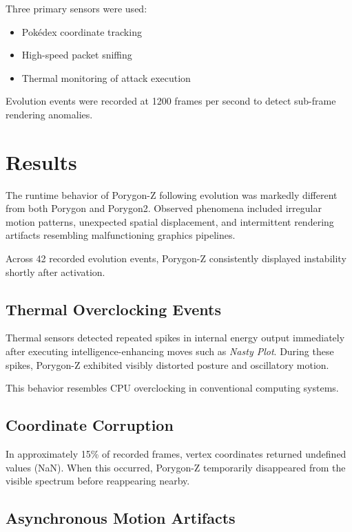 \documentclass[conference]{IEEEtran}
\begin{document}
Three primary sensors were used:

\begin{itemize}
\item Pokédex coordinate tracking
\item High-speed packet sniffing
\item Thermal monitoring of attack execution
\end{itemize}

Evolution events were recorded at 1200 frames per second to detect sub-frame rendering anomalies.

\section{Results}

The runtime behavior of Porygon-Z following evolution was markedly different from both Porygon and Porygon2. Observed phenomena included irregular motion patterns, unexpected spatial displacement, and intermittent rendering artifacts resembling malfunctioning graphics pipelines.

Across 42 recorded evolution events, Porygon-Z consistently displayed instability shortly after activation.

\subsection{Thermal Overclocking Events}

Thermal sensors detected repeated spikes in internal energy output immediately after executing intelligence-enhancing moves such as \textit{Nasty Plot}. During these spikes, Porygon-Z exhibited visibly distorted posture and oscillatory motion.

This behavior resembles CPU overclocking in conventional computing systems.

\subsection{Coordinate Corruption}

In approximately 15\% of recorded frames, vertex coordinates returned undefined values (NaN). When this occurred, Porygon-Z temporarily disappeared from the visible spectrum before reappearing nearby.

\subsection{Asynchronous Motion Artifacts}
\end{document}
